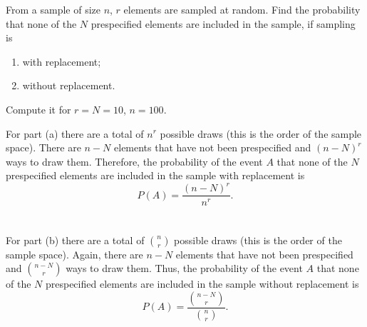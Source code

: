 \begin{problem}[Handout 1, \# 9]
  From a sample of size \(n\), \(r\) elements are sampled at random. Find
  the probability that none of the \(N\) prespecified elements are included
  in the sample, if sampling is
  \begin{enumerate}[label=(\alph*),noitemsep]
  \item with replacement;
  \item without replacement.
  \end{enumerate}
  Compute it for \(r=N=10\), \(n=100\).
\end{problem}
\begin{solution*}
  For part (a) there are a total of \(n^r\) possible draws (this is the
  order of the sample space). There are \(n-N\) elements that have not been
  prespecified and \((n-N)^r\) ways to draw them. Therefore, the
  probability of the event \(A\) that none of the \(N\) prespecified
  elements are included in the sample with replacement is
  \[
    P(A)=\frac{(n-N)^r}{n^r}.
  \]
  \\\\
  For part (b) there are a total of \(\binom{n}{r}\) possible draws (this
  is the order of the sample space). Again, there are \(n-N\) elements that
  have not been prespecified and \(\binom{n-N}{r}\) ways to draw
  them. Thus, the probability of the event \(A\) that none of the \(N\)
  prespecified elements are included in the sample without replacement is
  \[
    P(A)=\frac{\binom{n-N}{r}}{\binom{n}{r}}.
  \]
\end{solution*}

